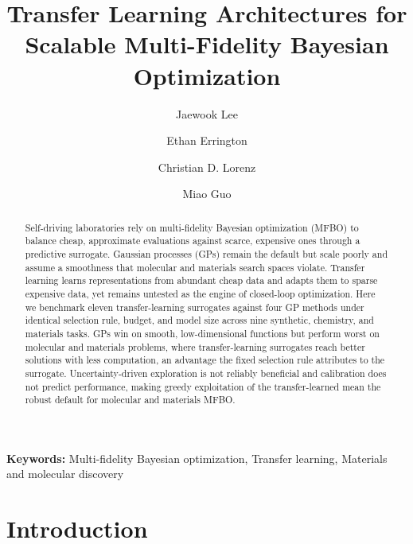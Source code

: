 \documentclass[11pt,a4paper]{article}%
\newcommand{\keywords}[1]{\par\medskip\noindent\textbf{Keywords:} #1}
\begin{document}
\title{Transfer Learning Architectures for Scalable Multi-Fidelity Bayesian
Optimization}

\author[1]{Jaewook Lee}
\author[1]{Ethan Errington}
\author[1]{Christian D. Lorenz}
\author[1,$*$]{Miao Guo}


\date{}

\maketitle

\begin{abstract}
Self-driving laboratories rely on multi-fidelity Bayesian optimization (MFBO) to balance cheap, approximate evaluations against scarce, expensive ones through a predictive surrogate. Gaussian processes (GPs) remain the default but scale poorly and assume a smoothness that molecular and materials search spaces violate. Transfer learning learns representations from abundant cheap data and adapts them to sparse expensive data, yet remains untested as the engine of closed-loop optimization. Here we benchmark eleven transfer-learning surrogates against four GP methods under identical selection rule, budget, and model size across nine synthetic, chemistry, and materials tasks. GPs win on smooth, low-dimensional functions but perform worst on molecular and materials problems, where transfer-learning surrogates reach better solutions with less computation, an advantage the fixed selection rule attributes to the surrogate. Uncertainty-driven exploration is not reliably beneficial and calibration does not predict performance, making greedy exploitation of the transfer-learned mean the robust default for molecular and materials MFBO.
\end{abstract}

\keywords{Multi-fidelity Bayesian optimization, Transfer learning,
Materials and molecular discovery}

\section{Introduction}
\end{document}
